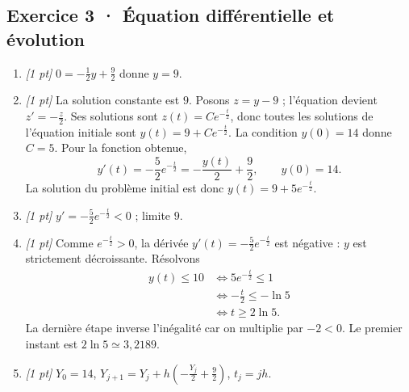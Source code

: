 \subsection*{Exercice 3 · Équation différentielle et évolution}\begin{enumerate}

\item \textit{[1 pt]} $0=-\frac{1}{2}y+\frac{9}{2}$ donne $y=9$.

\item \textit{[1 pt]} La solution constante est $9$. Posons $z=y-9$ ; l'équation devient $z'=-\frac{z}{2}$. Ses solutions sont $z(t)=Ce^{-\frac{t}{2}}$, donc toutes les solutions de l'équation initiale sont $y(t)=9+Ce^{-\frac{t}{2}}$.
La condition $y(0)=14$ donne $C=5$. Pour la fonction obtenue,
\[y'(t)=-\frac{5}{2}e^{-\frac{t}{2}}=-\frac{y(t)}{2}+\frac{9}{2},\qquad y(0)=14.\]
La solution du problème initial est donc $y(t)=9+5e^{-\frac{t}{2}}$.

\item \textit{[1 pt]} $y'=-\frac{5}{2}e^{-\frac{t}{2}}<0$ ; limite $9$.

\item \textit{[1 pt]} Comme $e^{-\frac{t}{2}}>0$, la dérivée $y'(t)=-\frac{5}{2}e^{-\frac{t}{2}}$ est négative : $y$ est strictement décroissante. Résolvons
\[\begin{aligned}y(t)\le 10&\Longleftrightarrow 5e^{-\frac{t}{2}}\le1\\&\Longleftrightarrow -\frac{t}{2}\le-\ln 5\\&\Longleftrightarrow t\ge 2\ln 5.\end{aligned}\]
La dernière étape inverse l'inégalité car on multiplie par $-2<0$. Le premier instant est $2\ln 5\simeq3{,}2189$.

\item \textit{[1 pt]} $Y_0=14$, $Y_{j+1}=Y_j+h(-\frac{Y_j}{2}+\frac{9}{2})$, $t_j=jh$.

\end{enumerate}

